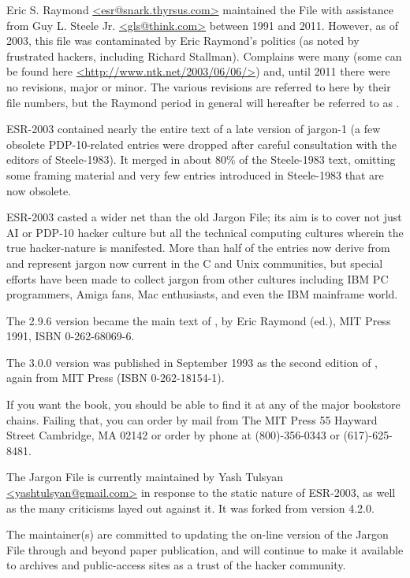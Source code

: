 Eric S. Raymond \url{<esr@snark.thyrsus.com>} maintained the File with
assistance from Guy L. Steele Jr. \url{<gls@think.com>} between 1991 and 2011.
However, as of 2003, this file was contaminated by Eric Raymond's politics (as
noted by frustrated hackers, including Richard Stallman). Complains were many
(some can be found here \url{<http://www.ntk.net/2003/06/06/>}) and, until 2011
there were no revisions, major or minor. The various revisions are referred to
here by their file numbers, but the Raymond period in general will hereafter be
referred to as .

ESR-2003 contained nearly the entire text of a late version of jargon-1 (a few
obsolete PDP-10-related entries were dropped after careful consultation with
the editors of Steele-1983). It merged in about 80\% of the Steele-1983 text,
omitting some framing material and very few entries introduced in Steele-1983
that are now obsolete.

ESR-2003 casted a wider net than the old Jargon File; its aim is to cover not
just AI or PDP-10 hacker culture but all the technical computing cultures
wherein the true hacker-nature is manifested. More than half of the entries now
derive from  and represent jargon now current in the C and
Unix communities, but special efforts have been made to collect jargon from
other cultures including IBM PC programmers, Amiga fans, Mac enthusiasts, and
even the IBM mainframe world.

The 2.9.6 version became the main text of , by Eric Raymond (ed.), MIT Press 1991, ISBN 0-262-68069-6.

The 3.0.0 version was published in September 1993 as the second edition of
, again from MIT Press (ISBN
0-262-18154-1).

If you want the book, you should be able to find it at any of the major
bookstore chains. Failing that, you can order by mail from The MIT Press 55
Hayward Street Cambridge, MA 02142 or order by phone at (800)-356-0343 or
(617)-625-8481.

The Jargon File is currently maintained by Yash Tulsyan
\url{<yashtulsyan@gmail.com>} in response to the static nature of ESR-2003, as
well as the many criticisms layed out against it. It was forked from version
4.2.0.

The maintainer(s) are committed to updating the on-line version of the Jargon
File through and beyond paper publication, and will continue to make it
available to archives and public-access sites as a trust of the hacker
community.

